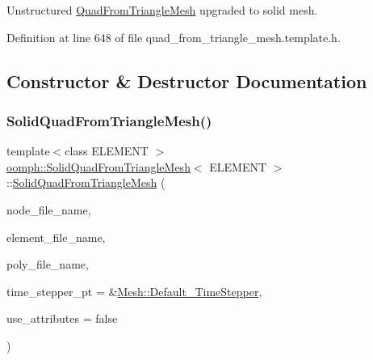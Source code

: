 Unstructured \hyperlink{classoomph_1_1QuadFromTriangleMesh}{Quad\+From\+Triangle\+Mesh} upgraded to solid mesh. 

Definition at line 648 of file quad\+\_\+from\+\_\+triangle\+\_\+mesh.\+template.\+h.



\subsection{Constructor \& Destructor Documentation}
\mbox{\label{classoomph_1_1SolidQuadFromTriangleMesh_ad4bc87ca77ca074e6153c383d04c1499}} 
\subsubsection{\texorpdfstring{Solid\+Quad\+From\+Triangle\+Mesh()}{SolidQuadFromTriangleMesh()}\hspace{0.1cm}{\footnotesize\ttfamily [1/2]}}
{\footnotesize\ttfamily template$<$class E\+L\+E\+M\+E\+NT $>$ \\
\hyperlink{classoomph_1_1SolidQuadFromTriangleMesh}{oomph\+::\+Solid\+Quad\+From\+Triangle\+Mesh}$<$ E\+L\+E\+M\+E\+NT $>$\+::\hyperlink{classoomph_1_1SolidQuadFromTriangleMesh}{Solid\+Quad\+From\+Triangle\+Mesh} (\begin{DoxyParamCaption}\item[{const std\+::string \&}]{node\+\_\+file\+\_\+name,  }\item[{const std\+::string \&}]{element\+\_\+file\+\_\+name,  }\item[{const std\+::string \&}]{poly\+\_\+file\+\_\+name,  }\item[{\hyperlink{classoomph_1_1TimeStepper}{Time\+Stepper} $\ast$}]{time\+\_\+stepper\+\_\+pt = {\ttfamily \&\hyperlink{classoomph_1_1Mesh_a12243d0fee2b1fcee729ee5a4777ea10}{Mesh\+::\+Default\+\_\+\+Time\+Stepper}},  }\item[{const bool \&}]{use\+\_\+attributes = {\ttfamily false} }\end{DoxyParamCaption})\hspace{0.3cm}{\ttfamily [inline]}}



